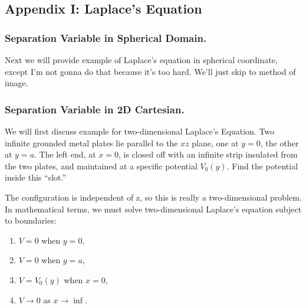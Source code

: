 \documentclass[../../../main.tex]{subfiles}
\begin{document}
\subsection{Appendix I: Laplace's Equation}

\subsubsection{Separation Variable in Spherical Domain.} Next we will provide example of Laplace's equation in spherical coordinate, except I'm not gonna do that because it's too hard. We'll just skip to method of image.

\subsubsection{Separation Variable in 2D Cartesian.} We will first discuss example for two-dimensional Laplace's Equation. Two infinite grounded metal plates lie parallel to the $x z$ plane, one at $y = 0$, the other at $y = a$. The left end, at $x = 0$, is closed off with an infinite strip insulated from the two plates, and maintained at a specific potential $V_0(y)$. Find the potential inside this “slot.”
\begin{figure*}[ht]
    \centering
\end{figure*}
The configuration is independent of z, so this is really a two-dimensional problem.
In mathematical terms, we must solve two-dimensional Laplace's equation subject to boundaries:
\begin{enumerate}
    \item $V = 0$ when $y = 0$,
    \item $V = 0$ when $y = a$,
    \item $V = V_0(y)$ when $x = 0$,
    \item $V \rightarrow 0$ as $x\rightarrow\inf $.
\end{enumerate}
\end{document}
